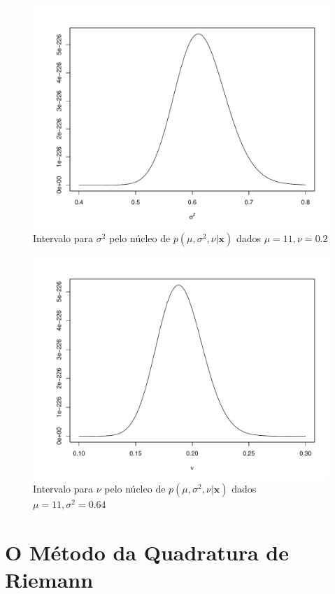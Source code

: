 \documentclass[12pt,reqno,a4paper,oneside]{article}
\begin{document}
\begin{figure}[htb]
	\centering
	\includegraphics[scale=0.7]{figuras/maspro_s2.pdf}
	\caption{Intervalo para $\sigma^2$ pelo núcleo de $p(\mu, \sigma^2, \nu | \bm{x})$ dados $\mu = 11, \nu = 0.2$}
	\label{fig:maspro_s2}
\end{figure}

\begin{figure}[htb]
	\centering
	\includegraphics[scale=0.7]{figuras/maspro_nu.pdf}
	\caption{Intervalo para $\nu$ pelo núcleo de $p(\mu, \sigma^2, \nu | \bm{x})$ dados $\mu = 11, \sigma^2 = 0.64$}
	\label{fig:maspro_nu}
\end{figure}

\section{\Large O Método da Quadratura de Riemann}\label{quarie}
\end{document}
